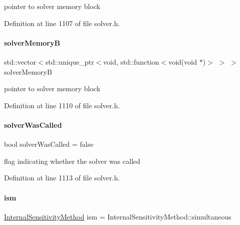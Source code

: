 pointer to solver memory block 

Definition at line 1107 of file solver.\+h.

\mbox{\label{classamici_1_1_solver_af450f49c134cba233622f7d07fc78c06}} 
\paragraph{\texorpdfstring{solver\+MemoryB}{solverMemoryB}}
{\footnotesize\ttfamily std\+::vector$<$std\+::unique\+\_\+ptr$<$void, std\+::function$<$void(void $\ast$)$>$ $>$ $>$ solver\+MemoryB\hspace{0.3cm}{\ttfamily [protected]}}

pointer to solver memory block 

Definition at line 1110 of file solver.\+h.

\mbox{\label{classamici_1_1_solver_a454f49f72b43a33add909d7ac630ce1c}} 
\paragraph{\texorpdfstring{solver\+Was\+Called}{solverWasCalled}}
{\footnotesize\ttfamily bool solver\+Was\+Called = false\hspace{0.3cm}{\ttfamily [protected]}}

flag indicating whether the solver was called 

Definition at line 1113 of file solver.\+h.

\mbox{\label{classamici_1_1_solver_a5b3b5ca18d3932765358bdf278290861}} 
\paragraph{\texorpdfstring{ism}{ism}}
{\footnotesize\ttfamily \mbox{\hyperlink{namespaceamici_aa444c52f0a5638d68702d1ec92f8db87}{Internal\+Sensitivity\+Method}} ism = Internal\+Sensitivity\+Method\+::simultaneous\hspace{0.3cm}{\ttfamily [protected]}}

